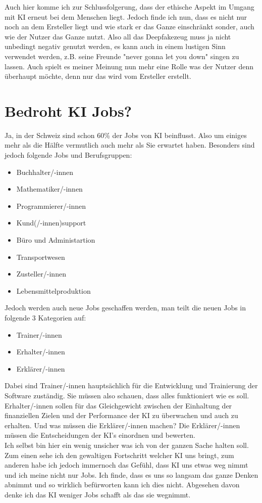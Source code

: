 Auch hier komme ich zur Schlussfolgerung, dass der ethische Aspekt im Umgang mit KI erneut bei dem Menschen liegt. Jedoch finde ich nun, dass es nicht nur noch an dem Ersteller liegt und wie stark er das Ganze einschränkt sonder, auch wie der Nutzer das Ganze nutzt.
Also all das Deepfakezeug muss ja nicht unbedingt negativ genutzt werden, es kann auch in einem lustigen Sinn verwendet werden, z.B. seine Freunde "never gonna let you down" singen zu lassen.
Auch spielt es meiner Meinung nun mehr eine Rolle was der Nutzer denn überhaupt möchte, denn nur das wird vom Ersteller erstellt.
\newpage
\section{Bedroht KI Jobs?}
Ja, in der Schweiz sind schon 60\% der Jobs von KI beinflusst. Also um einiges mehr als die Hälfte vermutlich auch mehr als Sie erwartet haben. Besonders sind jedoch folgende Jobs und Berufsgruppen:
\begin{itemize}
    \item Buchhalter/-innen
    \item Mathematiker/-innen
    \item Programmierer/-innen
    \item Kund(/-innen)support
    \item Büro und Administartion
    \item Transportwesen
    \item Zusteller/-innen
    \item Lebensmittelproduktion
\end{itemize}
Jedoch werden auch neue Jobs geschaffen werden, man teilt die neuen Jobs in folgende 3 Kategorien auf:
\begin{itemize}
    \item Trainer/-innen
    \item Erhalter/-innen
    \item Erklärer/-innen
\end{itemize}
Dabei sind Trainer/-innen hauptsächlich für die Entwicklung und Trainierung der Software zuständig. Sie müssen also schauen, dass alles funktioniert wie es soll.
Erhalter/-innen sollen für das Gleichgewicht zwischen der Einhaltung der finanziellen Zielen und der Performance der KI zu überwachen und auch zu erhalten.
Und was müssen die Erklärer/-innen machen? Die Erklärer/-innen müssen die Entscheidungen der KI's einordnen und bewerten.\citep{bedrohte-jobs-kununu}
\\
Ich selbst bin hier ein wenig unsicher was ich von der ganzen Sache halten soll. Zum einen sehe ich den  gewaltigen Fortschritt welcher KI uns bringt, zum anderen habe ich jedoch immernoch das Gefühl,
dass KI uns etwas weg nimmt und ich meine nicht nur Jobs. Ich finde, dass es uns so langsam das ganze Denken abnimmt und so wirklich befürworten kann ich dies nicht. Abgesehen davon denke ich das KI weniger Jobs schafft als das sie wegnimmt.
\\
\\
